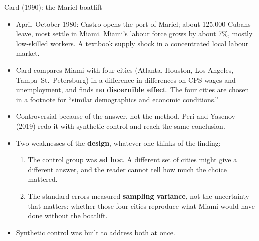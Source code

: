 \documentclass[
  11pt,
  ignorenonframetext,
  aspectratio=169,
]{beamer}
\providecommand{\tightlist}{%
  \setlength{\itemsep}{0pt}\setlength{\parskip}{0pt}}
\begin{document}
\begin{frame}{Card (1990): the Mariel boatlift}
\protect{}\label{card-1990-the-mariel-boatlift}
\begin{itemize}
\tightlist
\item
  April--October 1980: Castro opens the port of Mariel; about 125,000
  Cubans leave, most settle in Miami. Miami's labour force grows by
  about 7\%, mostly low-skilled workers. A textbook supply shock in a
  concentrated local labour market.
\item
  Card compares Miami with four cities (Atlanta, Houston, Los Angeles,
  Tampa--St.~Petersburg) in a difference-in-differences on CPS wages and
  unemployment, and finds \textbf{no discernible effect}. The four
  cities are chosen in a footnote for ``similar demographics and
  economic conditions.''
\item
  Controversial because of the answer, not the method. Peri and Yasenov
  (2019) redo it with synthetic control and reach the same conclusion.
\end{itemize}

\vspace{0.4em}

\begin{itemize}
\tightlist
\item
  Two weaknesses of the \textbf{design}, whatever one thinks of the
  finding:

  \begin{enumerate}
  \tightlist
  \item
    The control group was \textbf{ad hoc}. A different set of cities
    might give a different answer, and the reader cannot tell how much
    the choice mattered.
  \item
    The standard errors measured \textbf{sampling variance}, not the
    uncertainty that matters: whether those four cities reproduce what
    Miami would have done without the boatlift.
  \end{enumerate}
\item
  Synthetic control was built to address both at once.
\end{itemize}
\end{frame}
\end{document}

